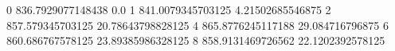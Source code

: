 0 836.7929077148438 0.0
1 841.0079345703125 4.21502685546875
2 857.579345703125 20.78643798828125
4 865.8776245117188 29.084716796875
6 860.686767578125 23.89385986328125
8 858.9131469726562 22.1202392578125
